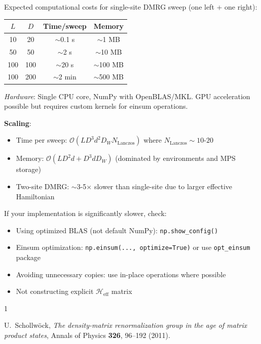 \documentclass[aps,prb,onecolumn,scriptaddress]{revtex4-2}
\newcommand{\Order}{\mathcal{O}}
\begin{document}
		Expected computational costs for single-site DMRG sweep (one left + one right):
		
		\begin{center}
		\begin{tabular}{@{}cccc@{}}
			\toprule
			$L$ & $D$ & Time/sweep & Memory \\
			\midrule
			10 & 20 & $\sim$0.1 s & $\sim$1 MB \\
			50 & 50 & $\sim$2 s & $\sim$10 MB \\
			100 & 100 & $\sim$20 s & $\sim$100 MB \\
			100 & 200 & $\sim$2 min & $\sim$500 MB \\
			\bottomrule
		\end{tabular}
		\end{center}
		
		\textit{Hardware}: Single CPU core, NumPy with OpenBLAS/MKL. GPU acceleration possible but requires custom kernels for einsum operations.
		
		\textbf{Scaling}: 
		\begin{itemize}
		\item Time per sweep: $\Order(L D^3 d^2 D_W N_{\text{Lanczos}})$ where $N_{\text{Lanczos}} \sim 10$-$20$
		\item Memory: $\Order(L D^2 d + D^3 d D_W)$ (dominated by environments and MPS storage)
		\item Two-site DMRG: $\sim$3-5$\times$ slower than single-site due to larger effective Hamiltonian
		\end{itemize}
		
		If your implementation is significantly slower, check:
		\begin{itemize}
		\item Using optimized BLAS (not default NumPy): \texttt{np.show\_config()}
		\item Einsum optimization: \texttt{np.einsum(..., optimize=True)} or use \texttt{opt\_einsum} package
		\item Avoiding unnecessary copies: use in-place operations where possible
		\item Not constructing explicit $\mathcal{H}_{\text{eff}}$ matrix
		\end{itemize}
		
		
		\begin{thebibliography}{1}
		
		U.~Schollw\"ock,
		\textit{The density-matrix renormalization group in the age of matrix product states},
		Annals of Physics \textbf{326}, 96--192 (2011).
		
		\end{thebibliography}
	
\end{document}
